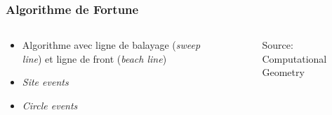 \begin{frame}
\frametitle{Algorithme de Fortune}
\begin{columns}
    \begin{column}{6cm}
    \begin{itemize} \itemsep3em
        \item Algorithme avec ligne de balayage (\textit{sweep line}) et ligne de front (\textit{beach line})
        \item \textit{Site events}
        \item \textit{Circle events}
    \end{itemize}
    \end{column}

    \begin{column}{5cm}
            \begin{figure}
                \def\stackalignment{r}
                {\sources Source: Computational Geometry}
            \end{figure}
    \end{column}
\end{columns}
\end{frame}


